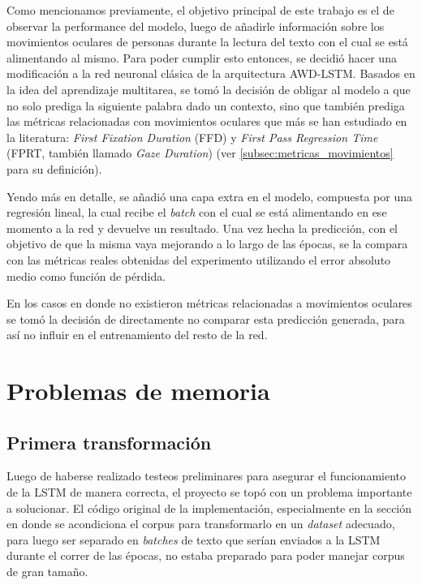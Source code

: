 Como mencionamos previamente, el objetivo principal de este trabajo es el de observar la performance del modelo, luego de añadirle información sobre los movimientos oculares de personas durante la lectura del texto con el cual se está alimentando al mismo. Para poder cumplir esto entonces, se decidió hacer una modificación a la red neuronal clásica de la arquitectura AWD-LSTM. Basados en la idea del aprendizaje multitarea, se tomó la decisión de obligar al modelo a que no solo prediga la siguiente palabra dado un contexto, sino que también prediga las métricas relacionadas con movimientos oculares que más se han estudiado en la literatura: \textit{First Fixation Duration} (FFD) y \textit{First Pass Regression Time} (FPRT, también llamado \textit{Gaze Duration}) (ver \ref{subsec:metricas_movimientos} para su definición).

Yendo más en detalle, se añadió una capa extra en el modelo, compuesta por una regresión lineal, la cual recibe el \textit{batch} con el cual se está alimentando en ese momento a la red y devuelve un resultado. Una vez hecha la predicción, con el objetivo de que la misma vaya mejorando a lo largo de las épocas, se la compara con las métricas reales obtenidas del experimento utilizando el error absoluto medio como función de pérdida.

En los casos en donde no existieron métricas relacionadas a movimientos oculares se tomó la decisión de directamente no comparar esta predicción generada, para así no influir en el entrenamiento del resto de la red.

\section{Problemas de memoria}

\subsection{Primera transformación}

Luego de haberse realizado testeos preliminares para asegurar el funcionamiento de la LSTM de manera correcta, el proyecto se topó con un problema importante a solucionar. El código original de la implementación, especialmente en la sección en donde se acondiciona el corpus para transformarlo en un \textit{dataset} adecuado, para luego ser separado en \textit{batches} de texto que serían enviados a la LSTM durante el correr de las épocas, no estaba preparado para poder manejar corpus de gran tamaño. 

